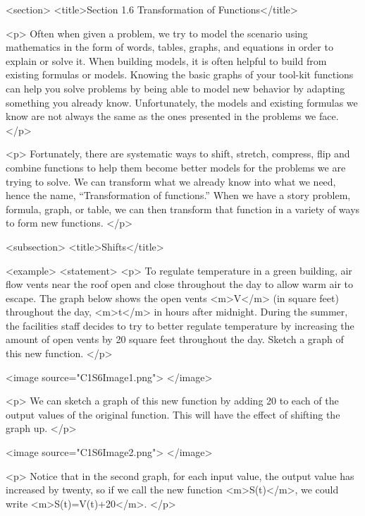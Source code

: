 <section>
    <title>Section 1.6 Transformation of Functions</title>

    <p>
        Often when given a problem, we try to model the scenario using mathematics in the form of words, tables, graphs, and equations in order to explain or solve it.
        When building models, it is often helpful to build from existing formulas or models.
        Knowing the basic graphs of your tool-kit functions can help you solve problems by being able to model new behavior by adapting something you already know.
        Unfortunately, the models and existing formulas we know are not always the same as the ones presented in the problems we face.
    </p>

    <p>
        Fortunately, there are systematic ways to shift, stretch, compress, flip and combine functions to help them become better models for the problems we are trying to solve.
        We can transform what we already know into what we need, hence the name, “Transformation of functions.” When we have a story problem, formula, graph, or table, we can then transform that function in a variety of ways to form new functions.
    </p>


    <subsection>
        <title>Shifts</title>

        <example>
            <statement>
                <p>
                    To regulate temperature in a green building, air flow vents near the roof open and close throughout the day to allow warm air to escape.
                    The graph below shows the open vents <m>V</m> (in square feet) throughout the day, <m>t</m> in hours after midnight.
                    During the summer, the facilities staff decides to try to better regulate temperature by increasing the amount of open vents by 20 square feet throughout the day.
                    Sketch a graph of this new function.
                </p>

                <image source="C1S6Image1.png">
                </image>

                <p>
                    We can sketch a graph of this new function by adding 20 to each of the output values of the original function.
                    This will have the effect of shifting the graph up.
                </p>

                <image source="C1S6Image2.png">
                </image>

                <p>
                    Notice that in the second graph, for each input value, the output value has increased by twenty, so if we call the new function <m>S(t)</m>, we could write <m>S(t)=V(t)+20</m>.
                </p>

